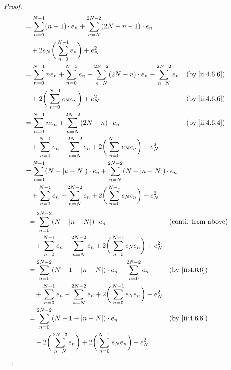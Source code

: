 \begin{proof}
\begin{align*}
     & = \sum_{n = 0}^{N - 1} (n + 1) \cdot e_n + \sum_{n = N}^{2N - 2} (2N - n - 1) \cdot e_n                                                           \\
     & \quad + 2 e_N \bigg(\sum_{n = 0}^{N - 1} e_n\bigg) + e_N^2                                                                                        \\
     & = \sum_{n = 0}^{N - 1} n e_n + \sum_{n = 0}^{N - 1} e_n + \sum_{n = N}^{2N - 2} (2N - n) \cdot e_n - \sum_{n = N}^{2N - 2} e_n &  & \by{ii:4.6.6} \\
     & \quad + 2 \bigg(\sum_{n = 0}^{N - 1} e_N e_n\bigg) + e_N^2                                                                     &  & \by{ii:4.6.6} \\
     & = \sum_{n = 0}^{N - 1} n e_n + \sum_{n = N}^{2N - 2} (2N - n) \cdot e_n                                                        &  & \by{ii:4.6.4} \\
     & \quad + \sum_{n = 0}^{N - 1} e_n - \sum_{n = N}^{2N - 2} e_n + 2 \bigg(\sum_{n = 0}^{N - 1} e_N e_n\bigg) + e_N^2                                 \\
     & = \sum_{n = 0}^{N - 1} (N - \abs{n - N}) \cdot e_n + \sum_{n = N}^{2N - 2} (N - \abs{n - N}) \cdot e_n                                            \\
     & \quad + \sum_{n = 0}^{N - 1} e_n - \sum_{n = N}^{2N - 2} e_n + 2 \bigg(\sum_{n = 0}^{N - 1} e_N e_n\bigg) + e_N^2
  \end{align*}
  \begin{align*}
     & = \sum_{n = 0}^{2N - 2} (N - \abs{n - N}) \cdot e_n                                                               &  & \text{(conti. from above)} \\
     & \quad + \sum_{n = 0}^{N - 1} e_n - \sum_{n = N}^{2N - 2} e_n + 2 \bigg(\sum_{n = 0}^{N - 1} e_N e_n\bigg) + e_N^2                                 \\
     & = \sum_{n = 0}^{2N - 2} (N + 1 - \abs{n - N}) \cdot e_n - \sum_{n = 0}^{2N - 2} e_n                               &  & \by{ii:4.6.6}              \\
     & \quad + \sum_{n = 0}^{N - 1} e_n - \sum_{n = N}^{2N - 2} e_n + 2 \bigg(\sum_{n = 0}^{N - 1} e_N e_n\bigg) + e_N^2                                 \\
     & = \sum_{n = 0}^{2N - 2} (N + 1 - \abs{n - N}) \cdot e_n                                                           &  & \by{ii:4.6.6}              \\
     & \quad - 2 \bigg(\sum_{n = N}^{2N - 2} e_n\bigg) + 2 \bigg(\sum_{n = 0}^{N - 1} e_N e_n\bigg) + e_N^2                                              \\

\end{align*}
\end{proof}
